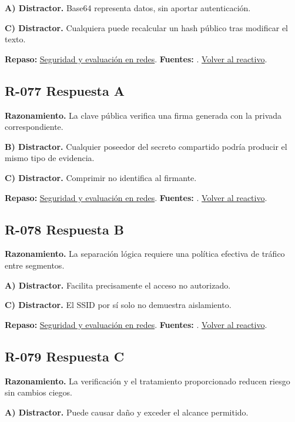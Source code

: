 \textbf{A) Distractor. }Base64 representa datos, sin aportar autenticación.

\textbf{C) Distractor. }Cualquiera puede recalcular un hash público tras modificar el texto.

\textbf{Repaso:} \hyperref[sec:r3]{Seguridad y evaluación en redes}. \textbf{Fuentes:} \cite{nistsecurity,owasp,aes,tls}. \hyperref[q:R-076]{Volver al reactivo}.\par\medskip

\subsection*{R-077 \quad Respuesta A}\label{s:R-077}
\textbf{Razonamiento.} La clave pública verifica una firma generada con la privada correspondiente.

\textbf{B) Distractor. }Cualquier poseedor del secreto compartido podría producir el mismo tipo de evidencia.

\textbf{C) Distractor. }Comprimir no identifica al firmante.

\textbf{Repaso:} \hyperref[sec:r3]{Seguridad y evaluación en redes}. \textbf{Fuentes:} \cite{nistsecurity,owasp,aes,tls}. \hyperref[q:R-077]{Volver al reactivo}.\par\medskip

\subsection*{R-078 \quad Respuesta B}\label{s:R-078}
\textbf{Razonamiento.} La separación lógica requiere una política efectiva de tráfico entre segmentos.

\textbf{A) Distractor. }Facilita precisamente el acceso no autorizado.

\textbf{C) Distractor. }El SSID por sí solo no demuestra aislamiento.

\textbf{Repaso:} \hyperref[sec:r3]{Seguridad y evaluación en redes}. \textbf{Fuentes:} \cite{nistsecurity,owasp,aes,tls}. \hyperref[q:R-078]{Volver al reactivo}.\par\medskip

\subsection*{R-079 \quad Respuesta C}\label{s:R-079}
\textbf{Razonamiento.} La verificación y el tratamiento proporcionado reducen riesgo sin cambios ciegos.

\textbf{A) Distractor. }Puede causar daño y exceder el alcance permitido.

